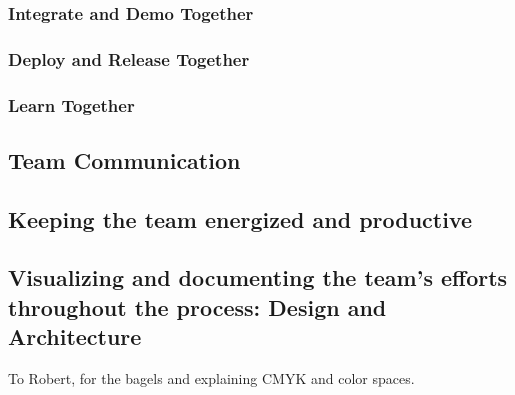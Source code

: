 \documentclass[sigplan,screen]{acmart}
\begin{document}
\subsubsection{Integrate and Demo Together}
\subsubsection{Deploy and Release Together}
\subsubsection{Learn Together}

\subsection{Team Communication}

\subsection{Keeping the team energized and productive}

\subsection{Visualizing and documenting the team's efforts throughout the process: Design and Architecture}




%
\begin{acks}
To Robert, for the bagels and explaining CMYK and color spaces.
\end{acks}

%


\end{document}
